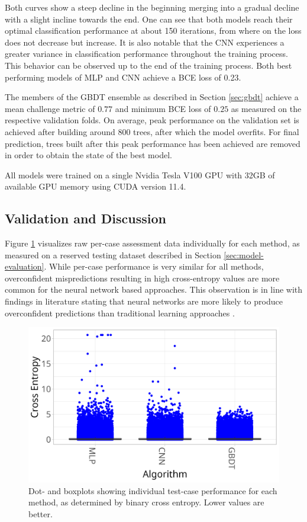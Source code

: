 \documentclass[runningheads]{llncs}
\begin{document}
Both curves show a steep decline in the beginning merging into a gradual decline with a slight incline towards the end. One can see that both models reach their optimal classification performance at about 150 iterations, from where on the loss does not decrease but increase. It is also notable that the CNN experiences a greater variance in classification performance throughout the training process. This behavior can be observed up to the end of the training process. Both best performing models of MLP and CNN achieve a BCE loss of 0.23.

The members of the GBDT ensemble as described in Section \ref{sec:gbdt} achieve a mean challenge metric of $0.77$ and minimum BCE loss of $0.25$ as measured on the respective validation folds. On average, peak performance on the validation set is achieved after building around 800 trees, after which the model overfits. For final prediction, trees built after this peak performance has been achieved are removed in order to obtain the state of the best model.

All models were trained on a single Nvidia Tesla V100 GPU with 32GB of available GPU memory using CUDA version 11.4.

\subsection{Validation and Discussion}
\label{sec:experiments-validation}

Figure \ref{fig:dot-plots-individual} visualizes raw per-case assessment data individually for each method, as measured on a reserved testing dataset described in Section \ref{sec:model-evaluation}. While per-case performance is very similar for all methods, overconfident mispredictions resulting in high cross-entropy values are more common for the neural network based approaches. This observation is in line with findings in literature stating that neural networks are more likely to produce overconfident predictions than traditional learning approaches \cite{abdar2021review}.

\begin{figure}
    \centering
    \includegraphics[width=.9\textwidth]{220923_boxplot_ranking_cross_entropy.png}
    \caption{Dot- and boxplots showing individual test-case performance for each method, as determined by binary cross entropy. Lower values are better.}
    \label{fig:dot-plots-individual}
\end{figure}
\end{document}
